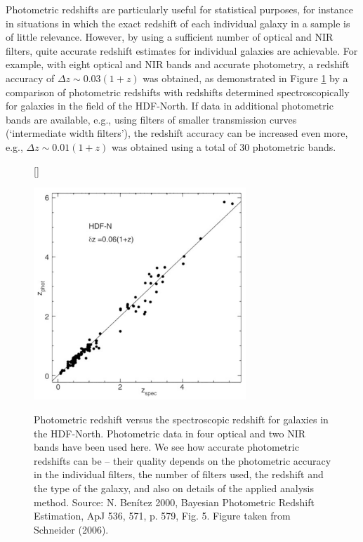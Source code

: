 \documentclass[a4paper,10pt]{article}
\begin{document}
{\noindent}Photometric redshifts are particularly useful for statistical purposes, for instance in situations in which the exact redshift of each individual galaxy in a sample is of little relevance. However, by using a sufficient number of optical and NIR filters, quite accurate redshift estimates for individual galaxies are achievable. For example, with eight optical and NIR bands and accurate photometry, a redshift accuracy of  $\Delta z\sim0.03(1+z)$ was obtained, as demonstrated in Figure \ref{fig:photvsspecredshift} by a comparison of photometric redshifts with redshifts determined spectroscopically for galaxies in the field of the HDF-North. If data in additional photometric bands are available, e.g., using filters of smaller transmission curves (`intermediate width filters'), the redshift accuracy can be increased even more, e.g., $\Delta z\sim0.01(1+z)$ was obtained using a total of 30 photometric bands.

\begin{figure}[t]
    [\FBwidth]
    {\caption{\footnotesize{Photometric redshift versus the spectroscopic redshift for galaxies in the HDF-North. Photometric data in four optical and two NIR bands have been used here. We see how accurate photometric redshifts can be -- their quality depends on the photometric accuracy in the individual filters, the number of filters used, the redshift and the type of the galaxy, and also on details of the applied analysis method. Source: N. Benítez 2000, Bayesian Photometric Redshift Estimation, ApJ 536, 571, p. 579, Fig. 5. Figure taken from Schneider (2006).}}
    \label{fig:photvsspecredshift}}
    {\includegraphics[width=8cm]{figures/PhotVsSpecRedshift.png}}
\end{figure}
\end{document}
